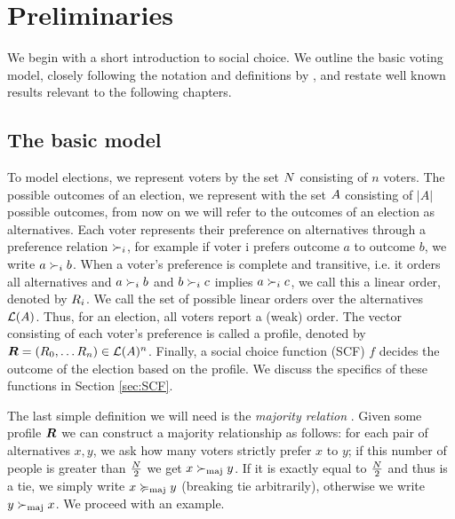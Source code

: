 \chapter{Preliminaries}
\label{chap: preliminaries}

We begin with a short introduction to social choice. We outline
the basic voting model, closely following the notation and definitions by \citet{brandtHandbookComputationalSocial2016}, and restate well known results relevant to the following
chapters.

\section{The basic model}

To model elections, we represent voters by the set $N$ consisting of $n$
voters. The possible outcomes of an election, we represent with the set
$A$ consisting of $|A|$ possible outcomes, from now on we will
refer to the outcomes of an election as alternatives. Each voter represents
their preference on alternatives through a preference relation $\succ_i$, for
example if voter i prefers outcome $a$ to outcome $b$, we write $a \succ_i b$.
When a voter's preference is complete and transitive, i.e. it orders
all alternatives and $a \succ_i b$ and $b \succ_i c$ implies $a \succ_i c$, we
call this a linear order, denoted by $R_i$. We call the set of possible linear orders over the
alternatives $\mathcal{L}(A)$. Thus, for an election, all voters report a
(weak) order. The vector consisting of each voter's preference is called a
profile, denoted by $\boldsymbol{R} = (R_0, \dots R_{n}) \in \mathcal{L}(A)^{n}$. Finally, a social choice function (SCF)
$f$ decides the outcome of the election based on the profile. We discuss the
specifics of these functions in Section \cref{sec:SCF}.

The last simple definition we will need is the \emph{majority relation}
\cite{alma990028050780205131}. Given some profile $\boldsymbol{R}$ we can
construct a majority relationship as follows: for each pair of alternatives
$x,y$, we ask how many voters strictly prefer $x$ to $y$; if this number of people is
greater than $\frac{N}{2}$ we get $x  \succ_{\textnormal{maj}} y$. If it is exactly equal to
$\frac{N}{2}$ and thus is a tie, we simply write $x \succcurlyeq_{\textnormal{maj}} y$ (breaking tie arbitrarily), otherwise we write $y \succ_{\textnormal{maj}} x$. We proceed with an
example.

